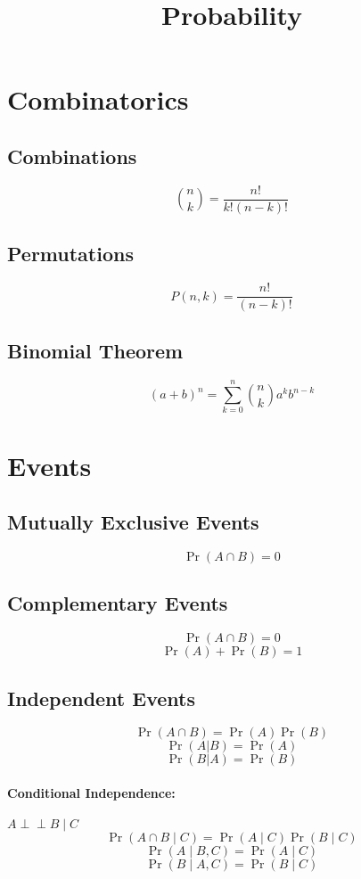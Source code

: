 \documentclass{article}
\title{Probability}
\date{}
\begin{document}
\maketitle

\tableofcontents

\newpage
\section{Combinatorics}

\subsection{Combinations}
\[
    \binom{n}{k} = \frac{n!}{k!(n-k)!}
\]

\subsection{Permutations}
\[
    P(n, k) = \frac{n!}{(n-k)!}
\]

\subsection{Binomial Theorem}
\[
    (a+b)^n = \sum_{k=0}^{n} \binom{n}{k} a^k b^{n-k}
\]

\newpage
\section{Events}

\subsection{Mutually Exclusive Events}
\[
    \Pr(A \cap B) = 0
\]

\subsection{Complementary Events}
\[
    \Pr(A \cap B) = 0
\]
\[
    \Pr(A) + \Pr(B) = 1
\]

\subsection{Independent Events}
\[
    \Pr(A \cap B) = \Pr(A)\Pr(B)
\]
\[
    \Pr(A|B) = \Pr(A)
\]
\[
    \Pr(B|A) = \Pr(B)
\]

\paragraph{Conditional Independence: }\( A \perp\!\!\!\perp B \mid C \)
\[
    \Pr(A \cap B \mid C) = \Pr(A \mid C) \Pr(B \mid C)
\]
\[
    \Pr(A \mid B, C) = \Pr(A \mid C)
\]
\[
    \Pr(B \mid A, C) = \Pr(B \mid C)
\]
\end{document}
